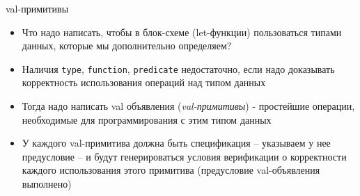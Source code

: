 \documentclass[hyperref={unicode=true}]{beamer}
\begin{document}
    \begin{frame}{val-примитивы}
    \begin{itemize}
    \item
    Что надо написать, чтобы в блок-схеме (let-функции) пользоваться
    типами данных, которые мы дополнительно определяем?
    \item
    Наличия \texttt{type}, \texttt{function}, \texttt{predicate}
    недостаточно, если надо доказывать корректность использования
    операций над типом данных
    \item
    Тогда надо написать val объявления (\emph{val-примитивы}) - простейшие
    операции, необходимые для программирования с этим типом данных
    \item
    У каждого val-примитива должна быть спецификация -- указываем
    у нее предусловие -- и будут генерироваться условия верификации
    о корректности каждого использования этого примитива (предусловие
    val-объявления выполнено)
    \end{itemize}
    \end{frame}
\end{document}
